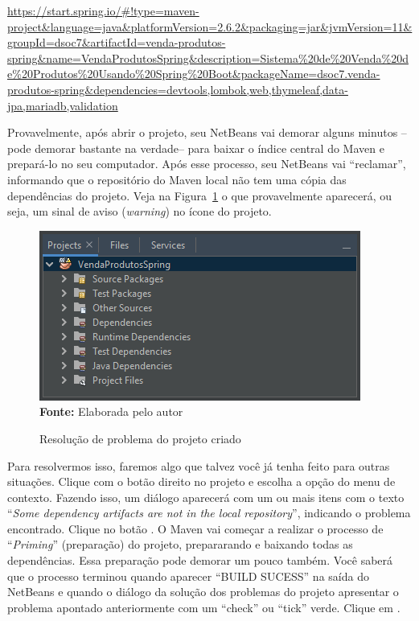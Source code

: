 \url{https://start.spring.io/#!type=maven-project&language=java&platformVersion=2.6.2&packaging=jar&jvmVersion=11&groupId=dsoc7&artifactId=venda-produtos-spring&name=VendaProdutosSpring&description=Sistema%20de%20Venda%20de%20Produtos%20Usando%20Spring%20Boot&packageName=dsoc7.venda-produtos-spring&dependencies=devtools,lombok,web,thymeleaf,data-jpa,mariadb,validation}

Provavelmente, após abrir o projeto, seu NetBeans vai demorar alguns minutos --pode demorar bastante na verdade-- para baixar o índice central do Maven e prepará-lo no seu computador. Após esse processo, seu NetBeans vai ``reclamar'', informando que o repositório do Maven local não tem uma cópia das dependências do projeto. Veja na Figura~\ref{fig:cap10ConfProjeto03} o que provavelmente aparecerá, ou seja, um sinal de aviso (\textit{warning}) no ícone do projeto.

\FloatBarrier
\begin{figure}[!htbp]
    \centering
    \caption{Resolução de problema do projeto criado}
    \includegraphics[scale=1]{imagens/cap10ConfProjeto03}
    \\\textbf{Fonte:} Elaborada pelo autor
    \label{fig:cap10ConfProjeto03}
\end{figure}
\FloatBarrier

Para resolvermos isso, faremos algo que talvez você já tenha feito para outras situações. Clique com o botão direito no projeto e escolha a opção  do menu de contexto. Fazendo isso, um diálogo aparecerá com um ou mais itens com o texto ``\textit{Some dependency artifacts are not in the local repository}'', indicando o problema encontrado. Clique no botão . O Maven vai começar a realizar o processo de ``\textit{Priming}'' (preparação) do projeto, prepararando e baixando todas as dependências. Essa preparação pode demorar um pouco também. Você saberá que o processo terminou quando aparecer ``BUILD SUCESS'' na saída do NetBeans e quando o diálogo da solução dos problemas do projeto apresentar o problema apontado anteriormente com um ``check'' ou ``tick'' verde. Clique em .

